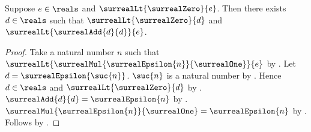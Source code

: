 \begin{theorem}\label{positive_real_has_twofold_dyadic_budget}
    Suppose $e\in\reals$ and $\surrealLt{\surrealZero}{e}$.
    Then there exists $d\in\reals$ such that
        $\surrealLt{\surrealZero}{d}$ and
        $\surrealLt{\surrealAdd{d}{d}}{e}$.
\end{theorem}
\begin{proof}
    Take a natural number $n$ such that
        $\surrealLt{\surrealMul{\surrealEpsilon{n}}{\surrealOne}}{e}$
        by
        .
    Let $d=\surrealEpsilon{\suc{n}}$.
    $\suc{n}$ is a natural number by .
    Hence $d\in\reals$ and $\surrealLt{\surrealZero}{d}$
        by .
    $\surrealAdd{d}{d}=\surrealEpsilon{n}$
        by .
    $\surrealMul{\surrealEpsilon{n}}{\surrealOne}
        =\surrealEpsilon{n}$
        by .
    Follows by \auto.
\end{proof}

